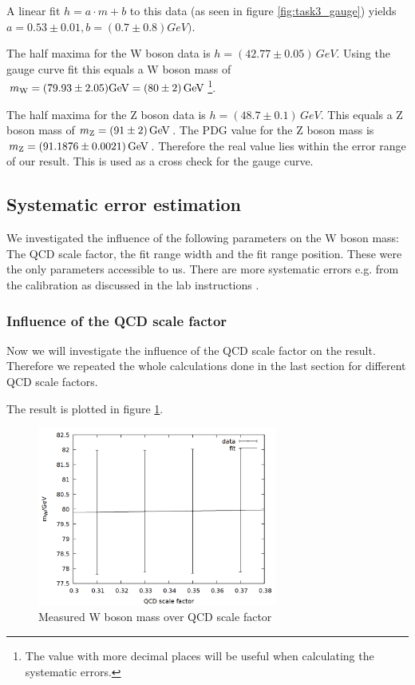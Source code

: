 A linear fit $h = a\cdot m + b$ to this data (as seen in figure \ref{fig:task3_gauge}) yields $a = 0.53\pm 0.01, b = (0.7 \pm 0.8) \si{GeV})$.

The half maxima for the W boson data is $h = (42.77\pm 0.05)\,\si{GeV}$. Using the gauge curve fit this equals a W boson mass of $m\ind{W} = (79.93 \pm 2.05) \si{GeV} = (80 \pm 2)\,\si{GeV}$\footnote{The value with more decimal places will be useful when calculating the systematic errors.}.

The half maxima for the Z boson data is $h = (48.7 \pm 0.1)\,\si{GeV}$. This equals a Z boson mass of $m\ind{Z} = (91 \pm 2) \,\si{GeV}$. The PDG value for the Z boson mass is $m\ind{Z} = (91.1876 \pm 0.0021)\,\si{GeV}$. Therefore the real value lies within the error range of our result. This is used as a cross check for the gauge curve.

\subsection{Systematic error estimation}

We investigated the influence of the following parameters on the W boson mass: The QCD scale factor, the fit range width and the fit range position. These were the only parameters accessible to us. There are more systematic errors e.g. from the calibration as discussed in the lab instructions \cite{lab_instructions}.

\subsubsection{Influence of the QCD scale factor}

Now we will investigate the influence of the QCD scale factor on the result. Therefore we repeated the whole calculations done in the last section for different QCD scale factors.

The result is plotted in figure \ref{fig:task3_qcd}.

\begin{figure}
\centering
\includegraphics[width=0.7\textwidth]{data/qcdfactor.png}
\caption{Measured W boson mass over QCD scale factor}
\label{fig:task3_qcd}
\end{figure}

